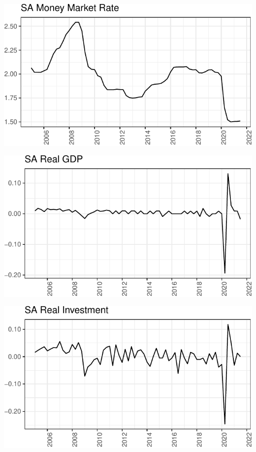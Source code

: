 \documentclass[11pt,preprint, authoryear]{elsarticle}
\let\origfigure\figure
\let\endorigfigure\endfigure
\renewenvironment{figure}[1][2] {
    \expandafter\origfigure\expandafter[H]
} {
    \endorigfigure
}
\numberwithin{equation}{section}
\numberwithin{figure}{section}
\numberwithin{table}{section}
\begin{document}
\begin{figure}[H]
\includegraphics{Factor-Model_files/figure-latex/unnamed-chunk-7-1} \caption{South Africa Money Market Rate \label{Fig5}}\label{fig:unnamed-chunk-7}
\end{figure}

\begin{figure}[H]
\includegraphics{Factor-Model_files/figure-latex/unnamed-chunk-8-1} \caption{South Africa Real GDP \label{Fig6}}\label{fig:unnamed-chunk-8}
\end{figure}

\begin{figure}[H]
\includegraphics{Factor-Model_files/figure-latex/unnamed-chunk-9-1} \caption{South Africa Real Gross Fixed Capital Formation \label{Fig7}}\label{fig:unnamed-chunk-9}
\end{figure}
\end{document}

